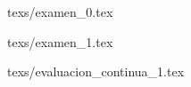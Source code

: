 \documentclass[11pt,fleqn]{book} %
\begin{document}
{texs/examen_0.tex}

{texs/examen_1.tex}



{texs/evaluacion_continua_1.tex}







\end{document}
